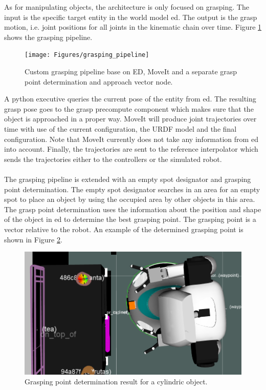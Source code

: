 As for manipulating objects, the architecture is only focused on grasping. The input is the specific target entity in the world model \acrshort{ed}. The output is the grasp motion, i.e. joint positions for all joints in the kinematic chain over time. Figure \ref{fig:grasping_pipeline} shows the grasping pipeline.
\begin{figure}[h]
    \centering
	\texttt{[image: Figures/grasping\_pipeline]}
	\caption{Custom grasping pipeline base on ED, MoveIt and a separate grasp point determination and approach vector node.}
	\label{fig:grasping_pipeline}
\end{figure}
A python executive queries the current pose of the entity from \acrshort{ed}. The resulting grasp pose goes to the grasp precompute component which makes sure that the object is approached in a proper way. MoveIt will produce joint trajectories over time with use of the current configuration, the URDF model and the final configuration. Note that MoveIt currently does not take any information from \acrshort{ed} into account. Finally, the trajectories are sent to the reference interpolator which sends the trajectories either to the controllers or the simulated robot.
\\\\
The grasping pipeline is extended with an empty spot designator and grasping point determination. The empty spot designator searches in an area for an empty spot to place an object by using the occupied area by other objects in this area.
\\
The grasp point determination uses the information about the position and shape of the object in \acrshort{ed} to determine the best grasping point. The grasping point is a vector relative to the robot. An example of the determined grasping point is shown in Figure \ref{fig:grasping_point_determination}.
 \begin{figure}[h]
    \centering
	\includegraphics[width = 0.8\linewidth]{Figures/grasp_point_determination}
	\caption{Grasping point determination result for a cylindric object.}
	\label{fig:grasping_point_determination}
\end{figure} 